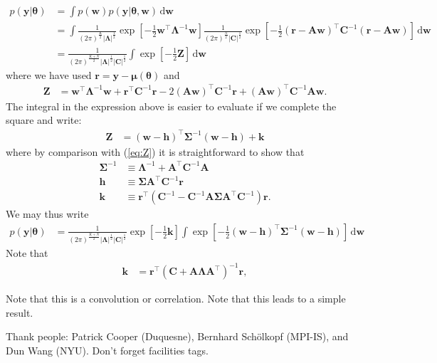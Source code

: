 \documentclass[modern]{rnaastex}
\newcommand{\dd}{\ensuremath{\,\mathrm{d}}}
\newcommand{\bvec}[1]{{\ensuremath{\boldsymbol{#1}}}}
\newcommand{\Gaussian}[3]{\ensuremath{\frac{1}{(2\pi)^\frac{#3}{2}|#2|^\frac{1}{2}}
            \exp\left[ -\frac{1}{2}#1^\top #2^{-1} #1 \right]}}
\begin{document}
\begin{align}
\label{eq:integral}
p(\bvec{y} | \bvec{\theta}) &=
    \int p(\bvec{w}) p(\bvec{y} | \bvec{\theta}, \bvec{w}) \dd\bvec{w}
    \nonumber \\
%
&= \int \Gaussian{\bvec{w}}{\bvec{\Lambda}}{K}
        \Gaussian{(\bvec{r} - \bvec{A}\bvec{w})}{\bvec{C}}{N}
        \dd\bvec{w} \nonumber \\
%
&= \frac{1}{(2\pi)^\frac{K+N}{2}
        |\bvec{\Lambda}|^\frac{1}{2}
        |\bvec{C}|^\frac{1}{2}}
   \int \exp\left[ -\frac{1}{2} \bvec{Z} \right] \dd\bvec{w}
\end{align}
%
where we have used $\bvec{r} = \bvec{y} - \bvec{\mu}(\bvec{\theta})$ and
%
\begin{align}
\label{eq:Z}
\bvec{Z} &= \bvec{w}^\top\bvec{\Lambda}^{-1}\bvec{w} +
            \bvec{r}^\top\bvec{C}^{-1}\bvec{r} -
            2(\bvec{A}\bvec{w})^\top \bvec{C}^{-1} \bvec{r} +
            (\bvec{A}\bvec{w})^\top \bvec{C}^{-1} \bvec{A}\bvec{w}.
\end{align}
%
The integral in the expression above is easier to evaluate if we
complete the square and write:
%
\begin{align}
\label{eq:Z_square}
\bvec{Z} &= (\bvec{w} - \bvec{h})^\top \bvec{\Sigma}^{-1}
            (\bvec{w} - \bvec{h}) + \bvec{k}
\end{align}
%
where by comparison with (\ref{eq:Z}) it is straightforward to show that
%
\begin{align}
\bvec{\Sigma}^{-1} &\equiv \bvec{\Lambda}^{-1} +
                           \bvec{A}^\top \bvec{C}^{-1} \bvec{A} \\
%
\bvec{h} &\equiv \bvec{\Sigma}\bvec{A}^\top \bvec{C}^{-1} \bvec{r} \\
%
\bvec{k} &\equiv \bvec{r}^\top
            \left(
            \bvec{C}^{-1} -
            \bvec{C}^{-1} \bvec{A} \bvec{\Sigma} \bvec{A}^\top \bvec{C}^{-1}
            \right) \bvec{r}.
\end{align}
We may thus write
%
\begin{align}
p(\bvec{y} | \bvec{\theta}) &=
        \frac{1}{(2\pi)^\frac{K+N}{2}
        |\bvec{\Lambda}|^\frac{1}{2}
        |\bvec{C}|^\frac{1}{2}}
    \exp
    \left[
        -\frac{1}{2}
        \bvec{k}
    \right]
   \int \exp
        \left[
            -\frac{1}{2}
            (\bvec{w} - \bvec{h})^\top \bvec{\Sigma}^{-1} (\bvec{w} - \bvec{h})
        \right]
     \dd\bvec{w}
\end{align}
%
%
%
Note that
\begin{align}
\bvec{k} &= \bvec{r}^\top
            \left(
            \bvec{C} + \bvec{A}\bvec{\Lambda}\bvec{A}^\top
            \right)^{-1}
            \bvec{r},
\end{align}

Note that this is a convolution or correlation. Note that this leads to a simple result.

\acknowledgements
Thank people:
  Patrick Cooper (Duquesne),
  Bernhard Sch\"olkopf (MPI-IS), and
  Dun Wang (NYU).
Don't forget facilities tags.


\end{document}
